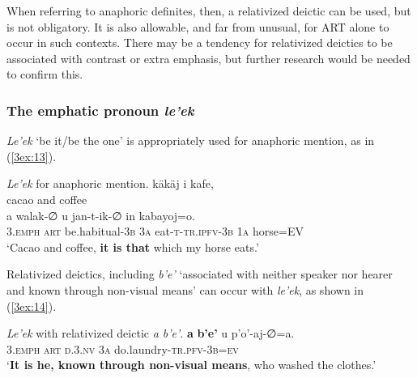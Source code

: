 \documentclass[output=paper]{langsci/langscibook}
\begin{document}
When referring to anaphoric definites, then, a relativized deictic can be used, but is not obligatory. It is also allowable, and far from unusual, for ART alone to occur in such contexts.  There may be a tendency for relativized deictics to be associated with contrast or extra emphasis, but further research would be needed to confirm this.


\subsubsection{The emphatic pronoun {\emph{le'ek}} }\label{3sec:313}
{\emph{Le'ek}} `be it/be the one' is appropriately used for anaphoric mention, as in (\ref{3ex:13}).

\newpage
\begin{exe}
\ex\label{3ex:13}
{\emph{Le'ek}} for anaphoric mention. 
\exi{}
\gll 	k\"ak\"aj 	i	kafe, 	 \\
	cacao	and	coffee	 \\
\glt
\exi{}
	 	a 	walak-{∅}	 		u 		jan-t-ik-{∅}			in 		kabayoj=o. \\
	3.{\textsc{emph}}	{\textsc{art}}	be.habitual-{\textsc{3b}} 	3{\textsc{a}}	eat-{\textsc{t-tr.ipfv-3b}}	1{\textsc{a}}	horse{\textsc{=EV}} \\
\glt 	`Cacao and coffee, {\textbf{it is that}} which my horse eats.'
\end{exe}

{
Relativized deictics, including {\emph{b'e'}} `associated with neither speaker nor hearer and known through non-visual means' can occur with {\emph{le'ek}}, as shown in (\ref{3ex:14}).
}

\begin{exe}
\ex\label{3ex:14}
{\emph{Le'ek}} with relativized deictic {\emph{a b'e'}}. 
\exi{}
 	{\textbf{a}} 	{\textbf{b'e'}}		u 		p'o'-aj-∅=a. \\
	3.{\textsc{emph}}	{\textsc{art}}	{\textsc{d.3.nv}}	3{\textsc{a}}	do.laundry-{\textsc{tr.pfv-3b=ev}} \\
\glt	`{\textbf{It is he, known through non-visual means}}, who washed the clothes.'
\end{exe}
\end{document}
